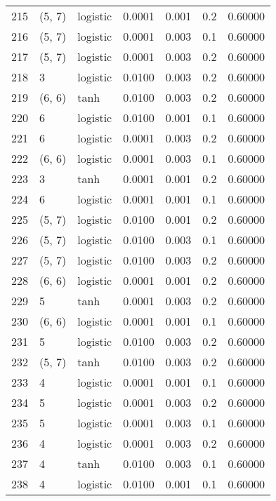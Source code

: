 \begin{tabular}{lllrrrr}
215 &      (5, 7) &  logistic &  0.0001 &  0.001 &  0.2 &   0.60000 \\
216 &      (5, 7) &  logistic &  0.0001 &  0.003 &  0.1 &   0.60000 \\
217 &      (5, 7) &  logistic &  0.0001 &  0.003 &  0.2 &   0.60000 \\
218 &           3 &  logistic &  0.0100 &  0.003 &  0.2 &   0.60000 \\
219 &      (6, 6) &      tanh &  0.0100 &  0.003 &  0.2 &   0.60000 \\
220 &           6 &  logistic &  0.0100 &  0.001 &  0.1 &   0.60000 \\
221 &           6 &  logistic &  0.0001 &  0.003 &  0.2 &   0.60000 \\
222 &      (6, 6) &  logistic &  0.0001 &  0.003 &  0.1 &   0.60000 \\
223 &           3 &      tanh &  0.0001 &  0.001 &  0.2 &   0.60000 \\
224 &           6 &  logistic &  0.0001 &  0.001 &  0.1 &   0.60000 \\
225 &      (5, 7) &  logistic &  0.0100 &  0.001 &  0.2 &   0.60000 \\
226 &      (5, 7) &  logistic &  0.0100 &  0.003 &  0.1 &   0.60000 \\
227 &      (5, 7) &  logistic &  0.0100 &  0.003 &  0.2 &   0.60000 \\
228 &      (6, 6) &  logistic &  0.0001 &  0.001 &  0.2 &   0.60000 \\
229 &           5 &      tanh &  0.0001 &  0.003 &  0.2 &   0.60000 \\
230 &      (6, 6) &  logistic &  0.0001 &  0.001 &  0.1 &   0.60000 \\
231 &           5 &  logistic &  0.0100 &  0.003 &  0.2 &   0.60000 \\
232 &      (5, 7) &      tanh &  0.0100 &  0.003 &  0.2 &   0.60000 \\
233 &           4 &  logistic &  0.0001 &  0.001 &  0.1 &   0.60000 \\
234 &           5 &  logistic &  0.0001 &  0.003 &  0.2 &   0.60000 \\
235 &           5 &  logistic &  0.0001 &  0.003 &  0.1 &   0.60000 \\
236 &           4 &  logistic &  0.0001 &  0.003 &  0.2 &   0.60000 \\
237 &           4 &      tanh &  0.0100 &  0.003 &  0.1 &   0.60000 \\
238 &           4 &  logistic &  0.0100 &  0.001 &  0.1 &   0.60000 \\

\end{tabular}
